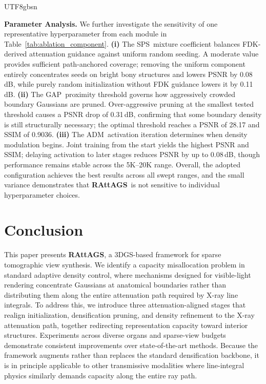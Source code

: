 \documentclass{egpubl}
\newcommand{\traceplain}{RAttAGS}
\newcommand{\RAttAGS}{\textbf{\traceplain}}
\newcommand{\sps}{SPS}
\newcommand{\gap}{GAP}
\newcommand{\adm}{ADM}
\begin{document}
\begin{CJK*}{UTF8}{gbsn}


\textbf{Parameter Analysis.} We further investigate the sensitivity of one representative hyperparameter from each module in Table~\ref{tab:ablation_component}. \textbf{(i)} The \sps\ mixture coefficient balances FDK-derived attenuation guidance against uniform random seeding. A moderate value provides sufficient path-anchored coverage; removing the uniform component entirely concentrates seeds on bright bony structures and lowers PSNR by 0.08\,dB, while purely random initialization without FDK guidance lowers it by 0.11\,dB. \textbf{(ii)} The \gap\ proximity threshold governs how aggressively crowded boundary Gaussians are pruned. Over-aggressive pruning at the smallest tested threshold causes a PSNR drop of 0.31\,dB, confirming that some boundary density is still structurally necessary; the optimal threshold reaches a PSNR of 28.17 and SSIM of 0.9036. \textbf{(iii)} The \adm\ activation iteration determines when density modulation begins. Joint training from the start yields the highest PSNR and SSIM; delaying activation to later stages reduces PSNR by up to 0.08\,dB, though performance remains stable across the 5K--20K range. Overall, the adopted configuration achieves the best results across all swept ranges, and the small variance demonstrates that \RAttAGS\ is not sensitive to individual hyperparameter choices.

\FloatBarrier

\section{Conclusion}
\label{sec:conclusion}

This paper presents \RAttAGS, a 3DGS-based framework for sparse tomographic view synthesis.  We identify a capacity misallocation problem in standard adaptive density control, where mechanisms designed for visible-light rendering concentrate Gaussians at anatomical boundaries rather than distributing them along the entire attenuation path required by X-ray line integrals.  To address this, we introduce three attenuation-aligned stages that realign initialization, densification pruning, and density refinement to the X-ray attenuation path, together redirecting representation capacity toward interior structures.  Experiments across diverse organs and sparse-view budgets demonstrate consistent improvements over state-of-the-art methods.  Because the framework augments rather than replaces the standard densification backbone, it is in principle applicable to other transmissive modalities where line-integral physics similarly demands capacity along the entire ray path.

\printbibliography
\ifXeTeX\else\end{CJK*}\fi
\end{document}
